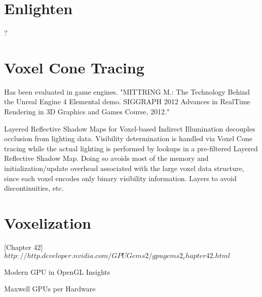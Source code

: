 \documentclass[thesis.tex]{subfiles}
\begin{document}
\section{Enlighten}?

\section{Voxel Cone Tracing}

 Has been evaluated in game engines. "MITTRING M.: The Technology Behind the Unreal Engine 4 Elemental demo. SIGGRAPH 2012 Advances in RealTime Rendering in 3D Graphics and Games Course, 2012." 

Layered Reflective Shadow Maps for Voxel-based Indirect Illumination decouples occlusion from lighting data.
Visibility determination is handled via Voxel Cone tracing while the actual lighting is performed by lookups in a pre-filtered Layered Reflective Shadow Map.
Doing so avoids most of the memory and initialization/update overhead associated with the large voxel data structure, since each voxel encodes only binary visibility information.
Layers to avoid discontinuities, etc.


\section{Voxelization}

\cite{bib:GPUGems2}[Chapter 42] $http://http.developer.nvidia.com/GPUGems2/gpugems2_chapter42.html$

Modern GPU in OpenGL Insights \cite{bib:openglinsightsvoxel}

Maxwell GPUs per Hardware

\subfilebib %
\end{document}
